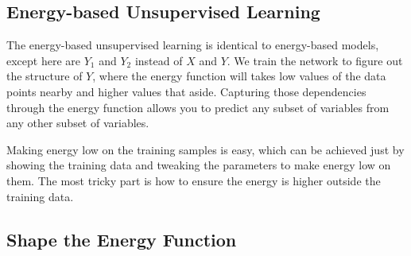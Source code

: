 \subsection{Energy-based Unsupervised Learning}

The energy-based unsupervised learning is identical to energy-based models, except here are $Y_1$ and $Y_2$ instead of $X$ and $Y$. We train the network to figure out the structure of $Y$, where the energy function will takes low values of the data points nearby and higher values that aside. Capturing those dependencies through the energy function allows you to predict any subset of variables from any other subset of variables.

Making energy low on the training samples is easy, which can be achieved just by showing the training data and tweaking the parameters to make energy low on them. The most tricky part is how to ensure the energy is higher outside the training data.

\subsection{Shape the Energy Function}

